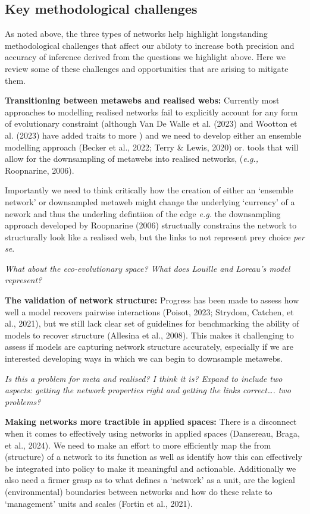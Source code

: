 \documentclass[
]{article}
\begin{document}
\subsection{Key methodological
challenges}\label{key-methodological-challenges}

As noted above, the three types of networks help highlight longstanding
methodological challenges that affect our abiloty to increase both
precision and accuracy of inference derived from the questions we
highlight above. Here we review some of these challenges and
opportunities that are arising to mitigate them.

\textbf{Transitioning between metawebs and realised webs:} Currently
most approaches to modelling realised networks fail to explicitly
account for any form of evolutionary constraint (although Van De Walle
et al. (2023) and Wootton et al. (2023) have added traits to more ) and
we need to develop either an ensemble modelling approach (Becker et al.,
2022; Terry \& Lewis, 2020) or. tools that will allow for the
downsampling of metawebs into realised networks, (\emph{e.g.,}
Roopnarine, 2006).

Importantly we need to think critically how the creation of either an
`ensemble network' or downsampled metaweb might change the underlying
`currency' of a nework and thus the underling defintiion of the edge
\emph{e.g.} the downsampling approach developed by Roopnarine (2006)
structually constrains the network to structurally look like a realised
web, but the links to not represent prey choice \emph{per se}.

\emph{What about the eco-evolutionary space? What does Louille and
Loreau's model represent?}

\textbf{The validation of network structure:} Progress has been made to
assess how well a model recovers pairwise interactions (Poisot, 2023;
Strydom, Catchen, et al., 2021), but we still lack clear set of
guidelines for benchmarking the ability of models to recover structure
(Allesina et al., 2008). This makes it challenging to assess if models
are capturing network structure accurately, especially if we are
interested developing ways in which we can begin to downsample metawebs.

\emph{Is this a problem for meta and realised? I think it is? Expand to
include two aspects: getting the network properties right and getting
the links correct\ldots. two problems?}

\textbf{Making networks more tractible in applied spaces:} There is a
disconnect when it comes to effectively using networks in applied spaces
(Dansereau, Braga, et al., 2024). We need to make an effort to more
efficiently map the from (structure) of a network to its function as
well as identify how this can effectively be integrated into policy to
make it meaningful and actionable. Additionally we also need a firmer
grasp as to what defines a `network' as a unit, are the logical
(environmental) boundaries between networks and how do these relate to
`management' units and scales (Fortin et al., 2021).
\end{document}
